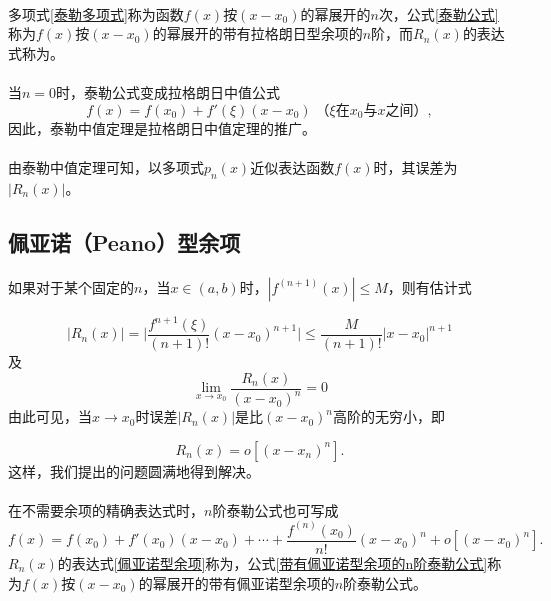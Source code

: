 \paragraph{}
多项式\eqref{泰勒多项式}称为函数$f(x)$按$(x-x_0)$的幂展开的$n$次，公式\eqref{泰勒公式}称为$f(x)$按$(x-x_0)$的幂展开的带有拉格朗日型余项的$n$阶，而$R_n(x)$的表达式称为。

\paragraph{}
当$n=0$时，泰勒公式变成拉格朗日中值公式
\begin{equation*}
  f(x) = f(x_0) + f'(\xi)(x-x_0) \; \text{（$\xi$在$x_0$与$x$之间）},
\end{equation*}
因此，泰勒中值定理是拉格朗日中值定理的推广。

\paragraph{}
由泰勒中值定理可知，以多项式$p_n(x)$近似表达函数$f(x)$时，其误差为$|R_n(x)|$。

\subsection{佩亚诺（Peano）型余项}
\paragraph{}
如果对于某个固定的$n$，当$x\in (a,b)$时，$|f^{(n+1)}(x)| \leq M$，则有估计式

\begin{equation}
  \label{佩亚诺型余项误差估计式}
  |R_n(x)| = \Big|\frac{f^{n+1}(\xi)}{(n+1)!}(x-x_0)^{n+1}\Big| \leq \frac{M}{(n+1)!}|x-x_0|^{n+1}
\end{equation}
及
\begin{equation}
  \lim_{x\to x_0}\frac{R_n(x)}{(x-x_0)^n} = 0
\end{equation}
由此可见，当$x\to x_0$时误差$|R_n(x)|$是比$(x-x_0)^n$高阶的无穷小，即

\begin{equation}
  \label{佩亚诺型余项}
  R_n(x) = o[(x-x_n)^n].
\end{equation}
这样，我们提出的问题圆满地得到解决。

\paragraph{}
在不需要余项的精确表达式时，$n$阶泰勒公式也可写成
\begin{equation}
  \label{带有佩亚诺型余项的n阶泰勒公式}
  f(x) = f(x_0) + f'(x_0)(x-x_0)+\cdots+\frac{f^{(n)}(x_0)}{n!}(x-x_0)^n + o[(x-x_0)^n].
\end{equation}
$R_n(x)$的表达式\eqref{佩亚诺型余项}称为，公式\eqref{带有佩亚诺型余项的n阶泰勒公式}称为$f(x)$按$(x-x_0)$的幂展开的带有佩亚诺型余项的$n$阶泰勒公式。

